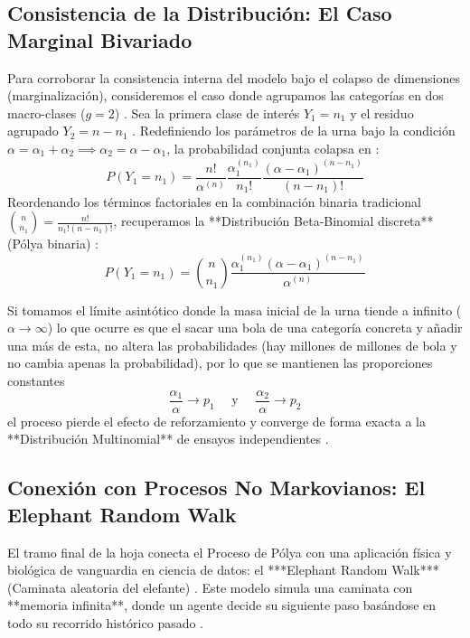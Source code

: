 \subsection{Consistencia de la Distribución: El Caso Marginal Bivariado}

Para corroborar la consistencia interna del modelo bajo el colapso de dimensiones (marginalización), consideremos el caso donde agrupamos las categorías en dos macro-clases ($g=2$) . Sea la primera clase de interés $Y_1 = n_1$ y el residuo agrupado $Y_2 = n - n_1$ . Redefiniendo los parámetros de la urna bajo la condición $\alpha = \alpha_1 + \alpha_2 \implies \alpha_2 = \alpha - \alpha_1$, la probabilidad conjunta colapsa en :
\begin{equation*}
    P(Y_1 = n_1) = \frac{n!}{\alpha^{(n)}} \frac{\alpha_1^{(n_1)}}{n_1!} \frac{(\alpha - \alpha_1)^{(n - n_1)}}{(n - n_1)!} 
\end{equation*}
Reordenando los términos factoriales en la combinación binaria tradicional $\binom{n}{n_1} = \frac{n!}{n_1!(n-n_1)!}$, recuperamos la **Distribución Beta-Binomial discreta** (Pólya binaria) :
\begin{equation*}
    P(Y_1 = n_1) = \binom{n}{n_1} \frac{\alpha_1^{(n_1)} (\alpha - \alpha_1)^{(n - n_1)}}{\alpha^{(n)}} 
\end{equation*}

Si tomamos el límite asintótico donde la masa inicial de la urna tiende a infinito ($\alpha \to \infty$) lo que ocurre es que el sacar una bola de una categoría concreta y añadir una más de esta, no altera las probabilidades (hay millones de millones de bola y no cambia apenas la probabilidad), por lo que se mantienen las proporciones constantes 
$$\dfrac{\alpha_1}{\alpha} \to p_1 \quad \text{ y } \quad \frac{\alpha_2}{\alpha} \to p_2$$
el proceso pierde el efecto de reforzamiento y converge de forma exacta a la **Distribución Multinomial** de ensayos independientes .


\subsection{Conexión con Procesos No Markovianos: El Elephant Random Walk}

El tramo final de la hoja conecta el Proceso de Pólya con una aplicación física y biológica de vanguardia en ciencia de datos: el ***Elephant Random Walk*** (Caminata aleatoria del elefante) . Este modelo simula una caminata con **memoria infinita**, donde un agente decide su siguiente paso basándose en todo su recorrido histórico pasado .

